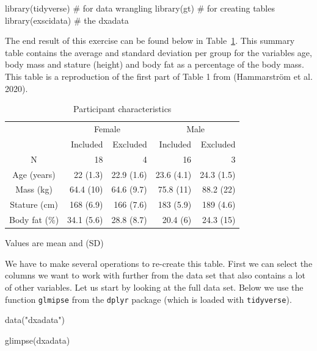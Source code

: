 \documentclass[
  11pt,
  letterpaper,
]{scrbook}
\newenvironment{Shaded}{\begin{snugshade}}{\end{snugshade}}
\newcommand{\CommentTok}[1]{\textcolor[rgb]{0.37,0.37,0.37}{#1}}
\newcommand{\FunctionTok}[1]{\textcolor[rgb]{0.28,0.35,0.67}{#1}}
\newcommand{\NormalTok}[1]{\textcolor[rgb]{0.00,0.23,0.31}{#1}}
\newcommand{\StringTok}[1]{\textcolor[rgb]{0.13,0.47,0.30}{#1}}
\begin{document}
\begin{Shaded}
\begin{Highlighting}[numbers=left,,]
\FunctionTok{library}\NormalTok{(tidyverse) }\CommentTok{\# for data wrangling}
\FunctionTok{library}\NormalTok{(gt) }\CommentTok{\# for creating tables}
\FunctionTok{library}\NormalTok{(exscidata) }\CommentTok{\# the dxadata}
\end{Highlighting}
\end{Shaded}

The end result of this exercise can be found below in
Table~\ref{tbl-table1-example}. This summary table contains the average
and standard deviation per group for the variables age, body mass and
stature (height) and body fat as a percentage of the body mass. This
table is a reproduction of the first part of Table 1 from (Hammarström
et al. 2020).

\hypertarget{tbl-table1-example}{}
\setlength{\LTpost}{0mm}
\begin{longtable}{crrrr}
\caption{\label{tbl-table1-example}Participant characteristics }\tabularnewline

\toprule
 & \multicolumn{2}{c}{Female} & \multicolumn{2}{c}{Male} \\ 
\cmidrule(lr){2-3} \cmidrule(lr){4-5}
  & Included & Excluded & Included & Excluded \\ 
\midrule
N & 18 & 4 & 16 & 3 \\ 
Age (years) & 22 (1.3) & 22.9 (1.6) & 23.6 (4.1) & 24.3 (1.5) \\ 
Mass (kg) & 64.4 (10) & 64.6 (9.7) & 75.8 (11) & 88.2 (22) \\ 
Stature (cm) & 168 (6.9) & 166 (7.6) & 183 (5.9) & 189 (4.6) \\ 
Body fat (\%) & 34.1 (5.6) & 28.8 (8.7) & 20.4 (6) & 24.3 (15) \\ 
\bottomrule
\end{longtable}
\begin{minipage}{\linewidth}
Values are mean and (SD)\\
\end{minipage}

We have to make several operations to re-create this table. First we can
select the columns we want to work with further from the data set that
also contains a lot of other variables. Let us start by looking at the
full data set. Below we use the function \texttt{glmipse} from the
\texttt{dplyr} package (which is loaded with \texttt{tidyverse}).

\begin{Shaded}
\begin{Highlighting}[numbers=left,,]
\FunctionTok{data}\NormalTok{(}\StringTok{"dxadata"}\NormalTok{)}

\FunctionTok{glimpse}\NormalTok{(dxadata)}
\end{Highlighting}
\end{Shaded}
\end{document}
